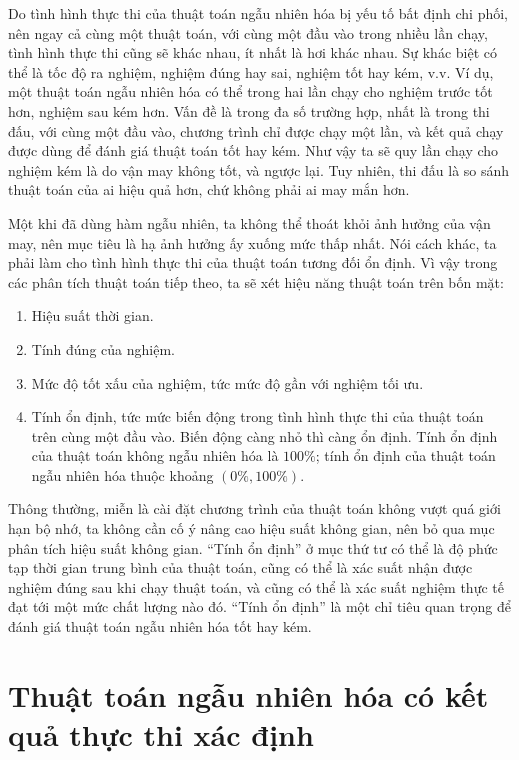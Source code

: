 \documentclass[11pt]{article}
\begin{document}
Do tình hình thực thi của thuật toán ngẫu nhiên hóa bị yếu tố bất định chi
phối, nên ngay cả cùng một thuật toán, với cùng một đầu vào trong nhiều lần
chạy, tình hình thực thi cũng sẽ khác nhau, ít nhất là hơi khác nhau. Sự khác
biệt có thể là tốc độ ra nghiệm, nghiệm đúng hay sai, nghiệm tốt hay kém,
v.v. Ví dụ, một thuật toán ngẫu nhiên hóa có thể trong hai lần chạy cho nghiệm
trước tốt hơn, nghiệm sau kém hơn. Vấn đề là trong đa số trường hợp, nhất là
trong thi đấu, với cùng một đầu vào, chương trình chỉ được chạy một lần, và
kết quả chạy được dùng để đánh giá thuật toán tốt hay kém. Như vậy ta sẽ quy
lần chạy cho nghiệm kém là do vận may không tốt, và ngược lại. Tuy nhiên, thi
đấu là so sánh thuật toán của ai hiệu quả hơn, chứ không phải ai may mắn hơn.

Một khi đã dùng hàm ngẫu nhiên, ta không thể thoát khỏi ảnh hưởng của vận may,
nên mục tiêu là hạ ảnh hưởng ấy xuống mức thấp nhất. Nói cách khác, ta phải
làm cho tình hình thực thi của thuật toán tương đối ổn định. Vì vậy trong các
phân tích thuật toán tiếp theo, ta sẽ xét hiệu năng thuật toán trên bốn mặt:
\begin{enumerate}
  \item Hiệu suất thời gian.
  \item Tính đúng của nghiệm.
  \item Mức độ tốt xấu của nghiệm, tức mức độ gần với nghiệm tối ưu.
  \item Tính ổn định, tức mức biến động trong tình hình thực thi của thuật
  toán trên cùng một đầu vào. Biến động càng nhỏ thì càng ổn định. Tính ổn
  định của thuật toán không ngẫu nhiên hóa là \(100\%\); tính ổn định của
  thuật toán ngẫu nhiên hóa thuộc khoảng \((0\%,100\%)\).
\end{enumerate}

Thông thường, miễn là cài đặt chương trình của thuật toán không vượt quá giới
hạn bộ nhớ, ta không cần cố ý nâng cao hiệu suất không gian, nên bỏ qua mục
phân tích hiệu suất không gian. ``Tính ổn định'' ở mục thứ tư có thể là độ
phức tạp thời gian trung bình của thuật toán, cũng có thể là xác suất nhận
được nghiệm đúng sau khi chạy thuật toán, và cũng có thể là xác suất nghiệm
thực tế đạt tới một mức chất lượng nào đó. ``Tính ổn định'' là một chỉ tiêu
quan trọng để đánh giá thuật toán ngẫu nhiên hóa tốt hay kém.

\section{Thuật toán ngẫu nhiên hóa có kết quả thực thi xác định}
\end{document}
